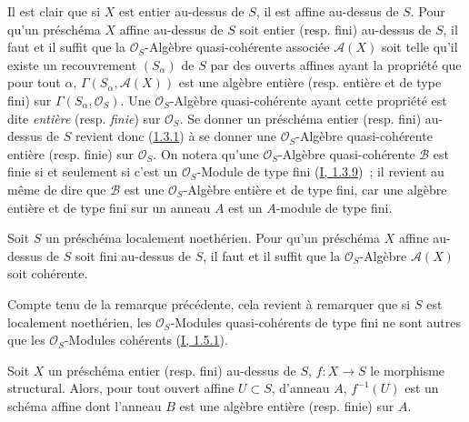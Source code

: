 \begin{env}[6.1.2]
\label{II.6.1.2-fr}
Il est clair que si $X$ est entier au-dessus de $S$, il est affine au-dessus
de $S$. Pour qu'un préschéma $X$ affine au-dessus de $S$ soit entier (resp.
fini) au-dessus de $S$, il faut et il suffit que la $\mathcal{O}_S$-Algèbre
quasi-cohérente associée $\mathcal{A}(X)$ soit telle qu'il existe un
recouvrement $(S_\alpha)$ de $S$ par des ouverts affines ayant la propriété
que pour tout $\alpha$, $\Gamma(S_\alpha,\mathcal{A}(X))$ est une algèbre
entière (resp. entière et de type fini) sur
$\Gamma(S_\alpha,\mathcal{O}_S)$. Une $\mathcal{O}_S$-Algèbre quasi-cohérente
ayant cette propriété est dite \emph{entière} (resp. \emph{finie}) sur
$\mathcal{O}_S$. Se donner un préschéma entier (resp. fini) au-dessus de $S$
revient donc (\hyperref[II.1.3.1-fr]{1.3.1}) à se donner une
$\mathcal{O}_S$-Algèbre quasi-cohérente entière (resp. finie) sur
$\mathcal{O}_S$. On notera qu'une $\mathcal{O}_S$-Algèbre quasi-cohérente
$\mathcal{B}$ est finie si et seulement si c'est un $\mathcal{O}_S$-Module de
type fini (\hyperref[I.1.3.9-fr]{I, 1.3.9})~; il revient au même de dire que
$\mathcal{B}$ est une $\mathcal{O}_S$-Algèbre entière et de type fini, car une
algèbre entière et de type fini sur un anneau $A$ est un $A$-module de type
fini.
\end{env}

\begin{proposition}[6.1.3]
\label{II.6.1.3-fr}
Soit $S$ un préschéma localement noethérien. Pour qu'un préschéma $X$ affine
au-dessus de $S$ soit fini au-dessus de $S$, il faut et il suffit que la
$\mathcal{O}_S$-Algèbre $\mathcal{A}(X)$ soit cohérente.
\end{proposition}

Compte tenu de la remarque précédente, cela revient à remarquer que si $S$ est
localement noethérien, les $\mathcal{O}_S$-Modules quasi-cohérents de type fini
ne sont autres que les $\mathcal{O}_S$-Modules cohérents
(\hyperref[I.1.5.1-fr]{I, 1.5.1}).

\begin{proposition}[6.1.4]
\label{II.6.1.4-fr}
Soit $X$ un préschéma entier (resp. fini) au-dessus de $S$, $f:X\to S$ le
morphisme structural. Alors, pour tout ouvert affine $U\subset S$, d'anneau
$A$, $f^{-1}(U)$ est un schéma affine dont l'anneau $B$ est une algèbre
entière (resp. finie) sur $A$.
\end{proposition}

